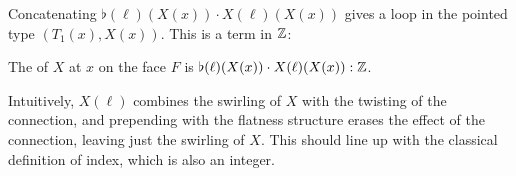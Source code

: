 Concatenating \( \flat(\ell)(X(x))\cdot X(\ell)(X(x)) \) gives a loop in the pointed type \( (T_1(x), X(x)) \). This is a term in \( \mathbb{Z} \):

\begin{mydef}
\label{def:index}
The  of \( X \) at \( x \) on the face \( F \) is \( \flat(\ell)(X(x))\cdot X(\ell)(X(x)):\mathbb{Z} \).
\end{mydef}

\begin{mynote}
Intuitively, \( X(\ell) \) combines the swirling of \( X \) with the twisting of the connection, and prepending with the flatness structure erases the effect of the connection, leaving just the swirling of \( X \). This should line up with the classical definition of index, which is also an integer.
\end{mynote}
